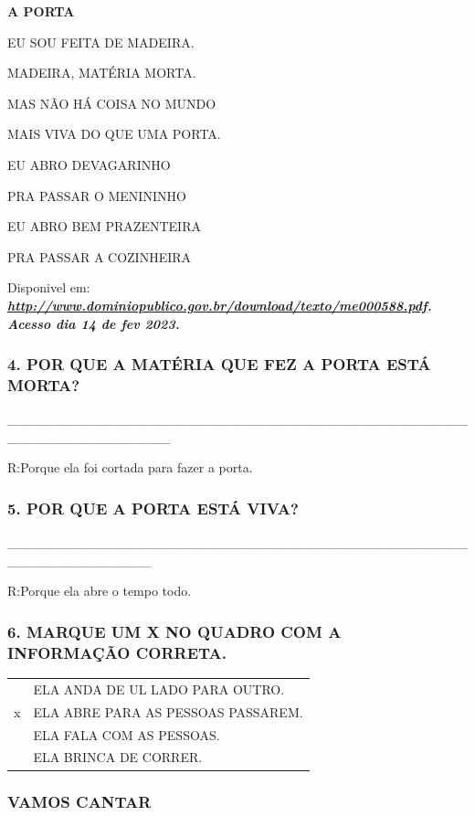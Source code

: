 \textbf{A PORTA}

EU SOU FEITA DE MADEIRA.

MADEIRA, MATÉRIA MORTA.

MAS NÃO HÁ COISA NO MUNDO

MAIS VIVA DO QUE UMA PORTA.

EU ABRO DEVAGARINHO

PRA PASSAR O MENININHO

EU ABRO BEM PRAZENTEIRA

PRA PASSAR A COZINHEIRA

Disponivel em:
\textbf{\emph{\url{http://www.dominiopublico.gov.br/download/texto/me000588.pdf}.
Acesso dia 14 de fev 2023.}}

\subsubsection{4. POR QUE A MATÉRIA QUE FEZ A PORTA ESTÁ
MORTA?}\label{por-que-a-maneira-que-fez-a-morta-estuxe1-morta}

\_\_\_\_\_\_\_\_\_\_\_\_\_\_\_\_\_\_\_\_\_\_\_\_\_\_\_\_\_\_\_\_\_\_\_\_\_\_\_\_\_\_\_\_\_\_\_\_\_\_\_\_\_\_\_\_\_\_\_\_\_\_\_\_\_

R:Porque ela foi cortada para fazer a porta.

\subsubsection{5. POR QUE A PORTA ESTÁ
VIVA?}\label{por-que-a-porta-estuxe1-viva}

\_\_\_\_\_\_\_\_\_\_\_\_\_\_\_\_\_\_\_\_\_\_\_\_\_\_\_\_\_\_\_\_\_\_\_\_\_\_\_\_\_\_\_\_\_\_\_\_\_\_\_\_\_\_\_\_\_\_\_\_\_\_\_

R:Porque ela abre o tempo todo.

\subsubsection{6. MARQUE UM X NO QUADRO COM A INFORMAÇÃO
CORRETA.}\label{marque-um-x-no-quadro-com-a-informauxe7uxe3o-correta.}

\begin{longtable}[]{@{}ll@{}}
\toprule
& ELA ANDA DE UL LADO PARA OUTRO.\tabularnewline
x & ELA ABRE PARA AS PESSOAS PASSAREM.\tabularnewline
& ELA FALA COM AS PESSOAS.\tabularnewline
& ELA BRINCA DE CORRER.\tabularnewline
\bottomrule
\end{longtable}

\subsubsection{VAMOS CANTAR}\label{vamos-cantar-1}

